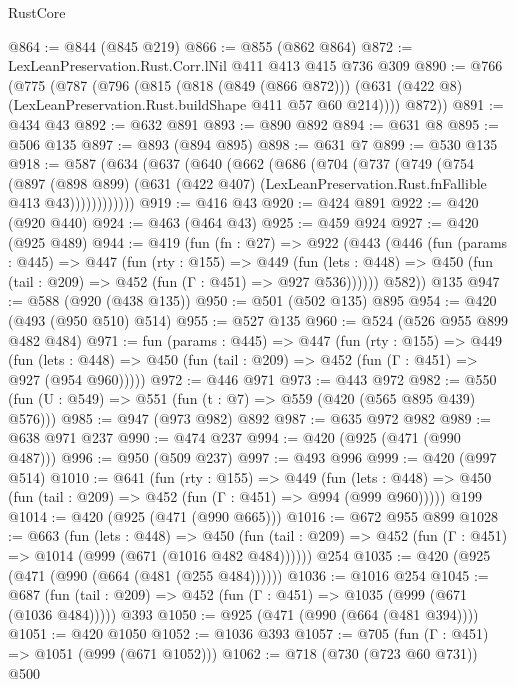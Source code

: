 \begin{lexlean}{RustCore}
\begin{coremodule}
@864 := @844 (@845 @219)
@866 := @855 (@862 @864)
@872 := LexLeanPreservation.Rust.Corr.lNil @411 @413 @415 @736 @309
@890 := @766
    (@775
      (@787
        (@796
          (@815
            (@818 (@849 (@866 @872)))
            (@631 (@422 @8) (LexLeanPreservation.Rust.buildShape @411 @57 @60 @214))))
        @872))
@891 := @434 @43
@892 := @632 @891
@893 := @890 @892
@894 := @631 @8
@895 := @506 @135
@897 := @893 (@894 @895)
@898 := @631 @7
@899 := @530 @135
@918 := @587
    (@634
      (@637
        (@640
          (@662
            (@686
              (@704
                (@737
                  (@749
                    (@754
                      (@897
                        (@898 @899)
                        (@631 (@422 @407) (LexLeanPreservation.Rust.fnFallible @413 @43))))))))))))
@919 := @416 @43
@920 := @424 @891
@922 := @420 (@920 @440)
@924 := @463 (@464 @43)
@925 := @459 @924
@927 := @420 (@925 @489)
@944 := @419
    (fun (fn : @27) =>
    @922
      (@443
        (@446
          (fun (params : @445) =>
          @447
            (fun (rty : @155) =>
            @449
              (fun (lets : @448) =>
              @450 (fun (tail : @209) => @452 (fun (Γ : @451) => @927 @536))))))
        @582))
    @135
@947 := @588 (@920 (@438 @135))
@950 := @501 (@502 @135) @895
@954 := @420 (@493 (@950 @510) @514)
@955 := @527 @135
@960 := @524 (@526 @955 @899 @482 @484)
@971 := fun (params : @445) =>
  @447
    (fun (rty : @155) =>
    @449
      (fun (lets : @448) => @450 (fun (tail : @209) => @452 (fun (Γ : @451) => @927 (@954 @960)))))
@972 := @446 @971
@973 := @443 @972
@982 := @550 (fun (U : @549) => @551 (fun (t : @7) => @559 (@420 (@565 @895 @439) @576)))
@985 := @947 (@973 @982) @892
@987 := @635 @972 @982
@989 := @638 @971 @237
@990 := @474 @237
@994 := @420 (@925 (@471 (@990 @487)))
@996 := @950 (@509 @237)
@997 := @493 @996
@999 := @420 (@997 @514)
@1010 := @641
    (fun (rty : @155) =>
    @449
      (fun (lets : @448) => @450 (fun (tail : @209) => @452 (fun (Γ : @451) => @994 (@999 @960)))))
    @199
@1014 := @420 (@925 (@471 (@990 @665)))
@1016 := @672 @955 @899
@1028 := @663
    (fun (lets : @448) =>
    @450 (fun (tail : @209) => @452 (fun (Γ : @451) => @1014 (@999 (@671 (@1016 @482 @484))))))
    @254
@1035 := @420 (@925 (@471 (@990 (@664 (@481 (@255 @484))))))
@1036 := @1016 @254
@1045 := @687 (fun (tail : @209) => @452 (fun (Γ : @451) => @1035 (@999 (@671 (@1036 @484))))) @393
@1050 := @925 (@471 (@990 (@664 (@481 @394))))
@1051 := @420 @1050
@1052 := @1036 @393
@1057 := @705 (fun (Γ : @451) => @1051 (@999 (@671 @1052)))
@1062 := @718 (@730 (@723 @60 @731)) @500

\end{coremodule}
\end{lexlean}
